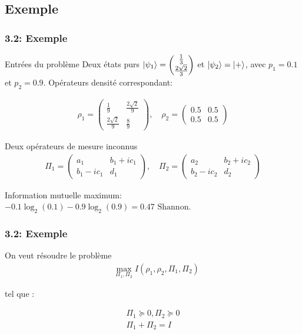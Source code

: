 \documentclass{beamer}
\begin{document}
\subsection{Exemple}
\begin{frame}
    \frametitle{3.2: Exemple}
    \scriptsize
    \begin{block}{Entrées du problème}
        Deux états purs $\ket{\psi_1} = \begin{pmatrix}\frac{1}{3} \\ \frac{2 \sqrt{2}}{3}\end{pmatrix}$ et $\ket{\psi_2} = \ket{+}$, avec $p_1 = 0.1$ et $p_2 = 0.9$. Opérateurs densité correspondant:

        \begin{align}
            \rho_1 = \begin{pmatrix}
                \frac{1}{9} & \frac{2 \sqrt{2}}{9} \\ \frac{2 \sqrt{2}}{9} & \frac{8}{9}
            \end{pmatrix}, 
            \quad \rho_2 = \begin{pmatrix}
                0.5 & 0.5 \\ 0.5 & 0.5
            \end{pmatrix} \nonumber
        \end{align}

    \end{block}
    \begin{block}{Deux opérateurs de mesure inconnus}
        \begin{align}
            \Pi_1 = \begin{pmatrix}
                a_1 & b_1 + ic_1 \\ b_1 - ic_1 & d_1
            \end{pmatrix}, \quad \Pi_2 = \begin{pmatrix}
                a_2 & b_2 + ic_2 \\ b_2 - ic_2 & d_2
            \end{pmatrix} \nonumber
        \end{align}

        Information mutuelle maximum: $-0.1\log_2(0.1) - 0.9\log_2(0.9) = 0.47 \text{ Shannon}.$ 

    \end{block}
\end{frame}

\begin{frame}
    \frametitle{3.2: Exemple}
    \small
    \begin{block}{}
        On veut résoudre le problème 
        \begin{align}
            &\max\limits_{\Pi_1, \Pi_2} I(\rho_1, \rho_2, \Pi_1, \Pi_2)
        \end{align}

        tel que :

        \begin{align}
            \Pi_1 \succeq 0, \Pi_2 \succeq 0\\
            \Pi_1 + \Pi_2 = I 
        \end{align}

    \end{block}
\end{frame}
\end{document}
